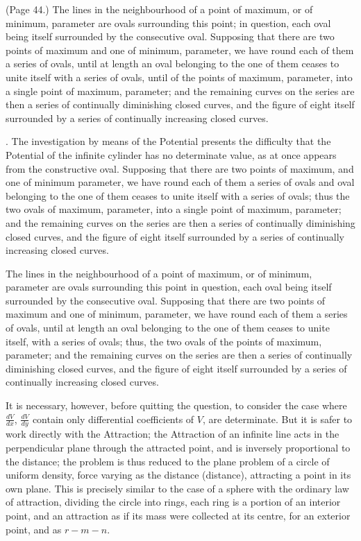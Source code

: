 \documentclass[11pt,a4paper]{article}
\begin{document}
\bigskip

\noindent (Page 44.) The lines in the neighbourhood of a point of maximum, or of minimum, parameter are ovals surrounding this point; in question, each oval being itself surrounded by the consecutive oval. Supposing that there are two points of maximum and one of minimum, parameter, we have round each of them a series of ovals, until at length an oval belonging to the one of them ceases to unite itself with a series of ovals, until of the points of maximum, parameter, into a single point of maximum, parameter; and the remaining curves on the series are then a series of continually diminishing closed curves, and the figure of eight itself surrounded by a series of continually increasing closed curves.

\medskip

. The investigation by means of the Potential presents the difficulty that the Potential of the infinite cylinder has no determinate value, as at once appears from the constructive oval. Supposing that there are two points of maximum, and one of minimum parameter, we have round each of them a series of ovals and oval belonging to the one of them ceases to unite itself with a series of ovals; thus the two ovals of maximum, parameter, into a single point of maximum, parameter; and the remaining curves on the series are then a series of continually diminishing closed curves, and the figure of eight itself surrounded by a series of continually increasing closed curves.

The lines in the neighbourhood of a point of maximum, or of minimum, parameter are ovals surrounding this point in question, each oval being itself surrounded by the consecutive oval. Supposing that there are two points of maximum and one of minimum, parameter, we have round each of them a series of ovals, until at length an oval belonging to the one of them ceases to unite itself, with a series of ovals; thus, the two ovals of the points of maximum, parameter; and the remaining curves on the series are then a series of continually diminishing closed curves, and the figure of eight itself surrounded by a series of continually increasing closed curves.

It is necessary, however, before quitting the question, to consider the case where $\frac{dV}{dx}$, $\frac{dV}{dy}$ contain only differential coefficients of $V$, are determinate. But it is safer to work directly with the Attraction; the Attraction of an infinite line acts in the perpendicular plane through the attracted point, and is inversely proportional to the distance; the problem is thus reduced to the plane problem of a circle of uniform density, force varying as the distance (distance), attracting a point in its own plane. This is precisely similar to the case of a sphere with the ordinary law of attraction, dividing the circle into rings, each ring is a portion of an interior point, and an attraction as if its mass were collected at its centre, for an exterior point, and as $r - m - n$.
\end{document}
